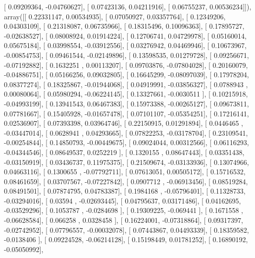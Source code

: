 \documentclass{article}
\begin{document}
       [ 0.09209364, -0.04760627],
       [ 0.07423136,  0.04211916],
       [ 0.06755237,  0.00536234]]), array([[ 0.22331147,  0.00534935],
       [ 0.07050927,  0.03357764],
       [ 0.12349206,  0.04303109],
       [ 0.21318087,  0.06735966],
       [ 0.18315496,  0.10096363],
       [ 0.17895727, -0.02638527],
       [ 0.08008924,  0.01914224],
       [ 0.12706741,  0.04729978],
       [ 0.05160014,  0.05675184],
       [ 0.03998554, -0.03912556],
       [ 0.03276942,  0.04469946],
       [ 0.10673967, -0.00854753],
       [ 0.09461544, -0.02149896],
       [ 0.13598535,  0.01279728],
       [ 0.09256671, -0.07192882],
       [ 0.1632251 ,  0.00113207],
       [ 0.09703876, -0.07804028],
       [ 0.20160079, -0.04886751],
       [ 0.05166256,  0.09032805],
       [ 0.16645299, -0.08097039],
       [ 0.17978204,  0.08377274],
       [ 0.18325867, -0.01944068],
       [ 0.04919991, -0.03856327],
       [ 0.0788943 ,  0.00080064],
       [ 0.05980294, -0.06224145],
       [ 0.13327661, -0.0030511 ],
       [ 0.10215918, -0.04993199],
       [ 0.13941543,  0.06467383],
       [ 0.15973388, -0.00265127],
       [ 0.09673811,  0.07781667],
       [ 0.15405928, -0.01657478],
       [ 0.07101107, -0.05354251],
       [ 0.17216141,  0.02536907],
       [ 0.07393398,  0.03964746],
       [ 0.22150915,  0.01291894],
       [ 0.0446465 , -0.03447014],
       [ 0.0628941 ,  0.04293665],
       [ 0.07822253, -0.03178704],
       [ 0.23109541, -0.00254844],
       [ 0.14850793, -0.00449675],
       [ 0.09024044,  0.00312566],
       [ 0.06116293, -0.04344546],
       [ 0.08649537,  0.0252219 ],
       [ 0.1320155 ,  0.08647443],
       [ 0.03351438, -0.03150919],
       [ 0.03436737,  0.11975375],
       [ 0.21509674, -0.03133936],
       [ 0.13074966,  0.04663116],
       [ 0.1300655 , -0.07792711],
       [ 0.07613051,  0.00505172],
       [ 0.15716532,  0.08461659],
       [ 0.03707567, -0.07227842],
       [ 0.0907712 , -0.06913456],
       [ 0.08519284,  0.08491501],
       [ 0.07874795,  0.04783387],
       [ 0.1984168 , -0.05796401],
       [ 0.11328733, -0.03294016],
       [ 0.03594   , -0.02693445],
       [ 0.04795637,  0.03171486],
       [ 0.04162695, -0.03529296],
       [ 0.1053787 , -0.0284698 ],
       [ 0.19309225, -0.069441  ],
       [ 0.1671558 , -0.06628584],
       [ 0.066258  ,  0.0328458 ],
       [ 0.16224001, -0.07318864],
       [ 0.09317397, -0.02742952],
       [ 0.07796557, -0.00032078],
       [ 0.07443867,  0.04493339],
       [ 0.18359582, -0.0138406 ],
       [ 0.09224528, -0.06214128],
       [ 0.15198449,  0.01781252],
       [ 0.16890192, -0.05050992],
\end{document}
